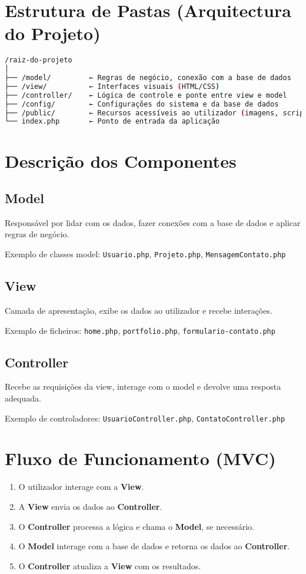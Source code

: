 \documentclass[12pt]{article}
\begin{document}
\section{Estrutura de Pastas (Arquitectura do Projeto)}
\begin{lstlisting}[language=bash]
/raiz-do-projeto
│
├── /model/         ← Regras de negócio, conexão com a base de dados
├── /view/          ← Interfaces visuais (HTML/CSS)
├── /controller/    ← Lógica de controle e ponte entre view e model
├── /config/        ← Configurações do sistema e da base de dados
├── /public/        ← Recursos acessíveis ao utilizador (imagens, scripts, etc.)
└── index.php       ← Ponto de entrada da aplicação
\end{lstlisting}

\section{Descrição dos Componentes}

\subsection{Model}
Responsável por lidar com os dados, fazer conexões com a base de dados e aplicar regras de negócio.

Exemplo de classes model: \texttt{Usuario.php}, \texttt{Projeto.php}, \texttt{MensagemContato.php}

\subsection{View}
Camada de apresentação, exibe os dados ao utilizador e recebe interações.

Exemplo de ficheiros: \texttt{home.php}, \texttt{portfolio.php}, \texttt{formulario-contato.php}

\subsection{Controller}
Recebe as requisições da view, interage com o model e devolve uma resposta adequada.

Exemplo de controladores: \texttt{UsuarioController.php}, \texttt{ContatoController.php}

\section{Fluxo de Funcionamento (MVC)}
\begin{enumerate}
  \item O utilizador interage com a \textbf{View}.
  \item A \textbf{View} envia os dados ao \textbf{Controller}.
  \item O \textbf{Controller} processa a lógica e chama o \textbf{Model}, se necessário.
  \item O \textbf{Model} interage com a base de dados e retorna os dados ao \textbf{Controller}.
  \item O \textbf{Controller} atualiza a \textbf{View} com os resultados.
\end{enumerate}
\end{document}
